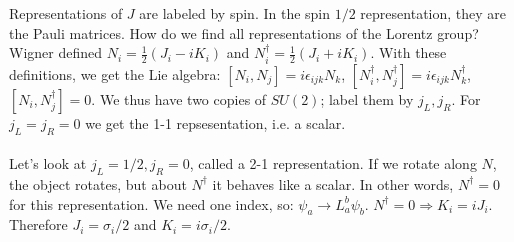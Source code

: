 \documentclass[12 pt]{article}
\begin{document}
\\
\\
Representations of $J$ are labeled by spin. In the spin $1/2$ representation, they are the Pauli matrices. How do we find all representations of the Lorentz group? Wigner defined $N_i = \frac{1}{2} (J_i - iK_i)$ and $N_i^{\dagger} = \frac{1}{2} (J_i + iK_i)$. With these definitions, we get the Lie algebra: $[N_i, N_j] = i \epsilon_{ijk} N_k$, $[N^{\dagger}_i, N^{\dagger}_j] = i \epsilon_{ijk} N^{\dagger}_k$, $[N_i , N_j^{\dagger}] = 0$. We thus have two copies of $SU(2)$; label them by $j_L, j_R$. For $j_L = j_R = 0$ we get the 1-1 repsesentation, i.e. a scalar.
\\
\\
Let's look at $j_L = 1/2, j_R = 0$, called a 2-1 representation. If we rotate along $N$, the object rotates, but about $N^{\dagger}$ it behaves like a scalar. In other words, $N^{\dagger} = 0$ for this representation. We need one index, so: $\psi_a \to L_a^b \psi_b$. $N^{\dagger} = 0 \Rightarrow K_i = iJ_i$. Therefore $J_i =  \sigma_i/2$ and $K_i = i \sigma_i /2$.
\end{document}
